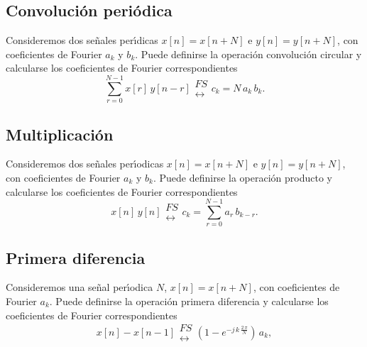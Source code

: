 \subsection{Convoluci\'{o}n peri\'{o}dica}

Consideremos dos se\~{n}ales per\'{\i}dicas $x[n] = x[n + N]$ e $y[n]
= y[n + N]$, con coeficientes de Fourier $a_{k}$ y $b_{k}$. Puede
definirse la operaci\'{o}n convoluci\'{o}n circular y calcularse los
coeficientes de Fourier correspondientes
\begin{equation}
\sum_{r=0}^{N-1} x\left[ r\right] \, y\left[ n-r\right] 
\begin{array}{l}
FS \\ 
\longleftrightarrow
\end{array}
c_{k}=N \, a_{k} \, b_{k}.
\end{equation}

\subsection{Multiplicaci\'{o}n}

Consideremos dos se\~{n}ales per\'{\i}odicas $x[n] = x[n + N]$ e $y[n]
= y[n + N]$, con coeficientes de Fourier $a_{k}$ y $b_{k}$. Puede
definirse la operaci\'{o}n producto y calcularse los
coeficientes de Fourier correspondientes
\begin{equation}
x\left[ n\right] \, y\left[ n\right] 
\begin{array}{l}
FS \\ 
\longleftrightarrow
\end{array}
c_{k}=\sum_{r=0}^{N-1}a_{r} \, b_{k-r}.
\end{equation}

\subsection{Primera diferencia}

Consideremos una se\~{n}al per\'{\i}odica $N$, $x\left[ n\right]
=x\left[ n+N\right]$, con coeficientes de Fourier
$a_{k}$. Puede definirse la operaci\'{o}n primera diferencia y
calcularse los coeficientes de Fourier correspondientes
\begin{equation}
x\left[ n\right] -x\left[ n-1\right] 
\begin{array}{l}
FS \\ 
\longleftrightarrow
\end{array}
\left( 1-e^{-j \, k \, \frac{2 \, \pi }{N}}\right) \, a_{k},
\end{equation}

